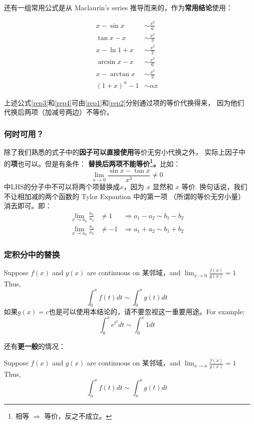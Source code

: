 还有一组常用公式是从 Maclaurin's series 推导而来的，作为\textbf{常用结论}使用：
\begin{lemma}[等价无穷小]
	\begin{align}
		x - \sin{x}     &\sim \frac{x^3}{6} \label{rep1} \\
		\tan{x} - x     &\sim \frac{x^3}{3} \label{rep2} \\
		x - \ln{1+x}    &\sim \frac{x^2}{2} \\
		\arcsin{x} - x  &\sim \frac{x^3}{6} \label{rep3}\\
		x - \arctan{x}  &\sim \frac{x^3}{3} \label{rep4}\\
		(1+x)^\alpha-1  &\sim \alpha x
	\end{align}
\end{lemma}
上述公式\eqref{rep3}和\eqref{rep4}可由\eqref{rep1}和\eqref{rep2}分别通过项的等价代换得来，
因为他们代换后两项（加减号两边）不等价。

\subsubsection{何时可用？}
除了我们熟悉的式子中的\textbf{因子可以直接使用}等价无穷小代换之外，
实际上因子中的\textbf{项}也可以。但是有条件：
\textbf{替换后两项不能等价\footnote{相等 $\Rightarrow$ 等价，反之不成立。}。}比如：
\[
\lim_{x \to 0} \frac{\sin{x} - \tan{x} }{x^3} \neq 0
\]
中LHS的分子中不可以将两个项替换成$x$，因为 $x$ 显然和 $x$ 等价.
换句话说，我们不让相加减的两个函数的 Tylor Expantion 中的第一项
（所谓的等价无穷小量）消去即可。即：
\begin{align}
	\lim_{ x\to x_0 } \frac{a_1}{a_2} &\neq 1  &\Rightarrow a_1 - a_2 \sim b_1 - b_2 \\
	\lim_{ x\to x_0 } \frac{a_1}{a_2} &\neq -1 &\Rightarrow a_1 + a_2 \sim b_1 + b_2
\end{align}

\subsubsection{定积分中的替换}
Suppose $f(x)$ and $g(x)$ are continuous on 某邻域，and $\lim_{x \to 0} \frac{f(x)}{g(x)} = 1$
Thus, 
\begin{equation}
	\int_0^{x} f(t) dt \sim \int_0^{x} g(t) dt
\end{equation}
如果$g(x)=c$也是可以使用本结论的，请不要忽视这一重要用途。For example:
\[
\int_0^x e^{t^2} dt \sim \int_0^{x} 1 dt
\]

还有\textbf{更一般}的情况：
\begin{lemma}
	Suppose $f(x)$ and $g(x)$ are continuous on 某邻域，and $\lim_{x \to a} \frac{f(x)}{g(x)} = 1$ 
	Thus, 
	\begin{equation}
		\int_a^{x} f(t) dt \sim \int_a^{x} g(t) dt
	\end{equation}
\end{lemma}

